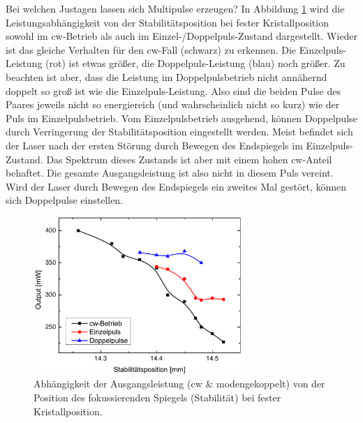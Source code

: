 \documentclass[bachelor,       %
               twoside,        %
               BCOR10mm,       %
               liststotoc,nomtotoc,bibtotoc, %
               english,ngerman, %
               final,          %
               ]{GAUBM}
\begin{document}
Bei welchen Justagen lassen sich Multipulse erzeugen?
In Abbildung \ref{fig:map2} wird die Leistungsabhängigkeit von der Stabilitätsposition bei fester Kristallposition sowohl im cw-Betrieb als auch im Einzel-/Doppelpuls-Zustand  dargestellt.
Wieder ist das gleiche Verhalten für den cw-Fall (schwarz) zu erkennen.
Die Einzelpuls-Leistung (rot) ist etwas größer, die Doppelpuls-Leistung (blau) noch größer.
Zu beachten ist aber, dass die Leistung im Doppelpulsbetrieb nicht annähernd doppelt so groß ist wie die Einzelpuls-Leistung.
Also sind die beiden Pulse des Paares jeweils nicht so energiereich (und wahrscheinlich nicht so kurz) wie der Puls im Einzelpulsbetrieb.
Vom Einzelpulsbetrieb ausgehend, können Doppelpulse durch Verringerung der Stabilitätsposition eingestellt werden.
Meist befindet sich der Laser nach der ersten Störung durch Bewegen des Endspiegels  im Einzelpuls-Zustand.
Das Spektrum dieses Zustands ist aber mit einem hohen cw-Anteil behaftet.
Die gesamte Ausgangsleistung ist also nicht in diesem Puls vereint.
Wird der Laser durch Bewegen des Endspiegels ein zweites Mal gestört, können sich Doppelpulse einstellen.

\begin{figure}[!htb]
	\centering
	\includegraphics[width=0.7\textwidth]{figures/map2.pdf}
	\caption{Abhängigkeit der Ausgangsleistung (cw \& modengekoppelt) von der Position des fokussierenden Spiegels (Stabilität) bei fester Kristallposition.}
	\label{fig:map2}
\end{figure}
\end{document}
